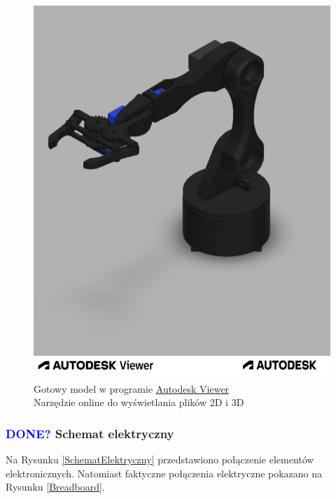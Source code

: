 \documentclass[11pt,titlepage,a4paper]{article}
\begin{document}
\newpage

\begin{figure}[h!]
    \vspace{1cm}
    \begin{center}
        \includegraphics[width=\textwidth]{img/Robak v25.f3d.png}
    \end{center}
    \vspace{1cm}
    \caption{
        Gotowy model w programie
        \href{https://viewer.autodesk.com/}
        {\underline{Autodesk Viewer}} \\ Narzędzie online do wyświetlania plików 2D i 3D}
    \label{AutodeskViewer}
\end{figure}

\newpage

\subsubsection{\textcolor{blue}{DONE?} Schemat elektryczny}

Na Rysunku \ref{SchematElektryczny} przedstawiono połączenie elementów elektronicznych. Natomiast faktyczne połączenia elektryczne pokazano na Rysunku \ref{Breadboard}.
\end{document}
